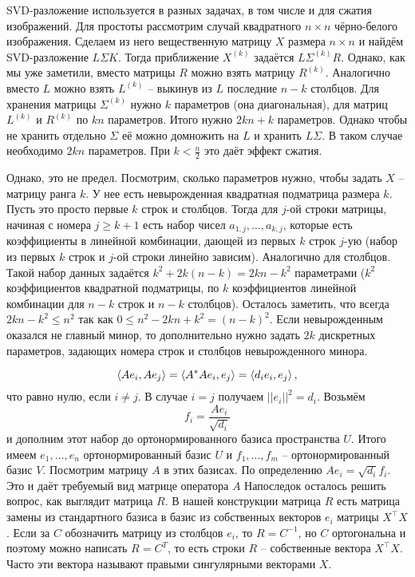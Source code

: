 SVD-разложение используется в разных задачах, в том числе и для сжатия изображений.  Для простоты рассмотрим случай квадратного $n \times n$ чёрно-белого изображения. Сделаем из него вещественную матрицу $X$ размера $n \times n$ и найдём SVD-разложение $L \Sigma K$. Тогда приближение $X^{(k)}$ задаётся $L\Sigma^{(k)}R$. Однако, как мы уже заметили, вместо матрицы $R$ можно взять матрицу $R^{(k)}$. Аналогично вместо $L$ можно взять $L^{(k)}$ -- выкинув из $L$ последние $n-k$ столбцов. Для хранения матрицы $\Sigma^{(k)}$ нужно $k$ параметров (она диагональная), для матриц $L^{(k)}$ и $R^{(k)}$ по $kn$ параметров. Итого нужно $2kn+k$ параметров. Однако чтобы не хранить отдельно $\Sigma$ её можно домножить на $L$ и хранить $L\Sigma$. В таком случае необходимо $2kn$ параметров. При $k<\frac{n}{2}$ это даёт эффект сжатия. 

Однако, это не предел. Посмотрим, сколько параметров нужно, чтобы задать $X$ -- матрицу ранга $k$. У нее есть невырожденная квадратная подматрица размера $k$. Пусть это просто первые $k$ строк и столбцов. Тогда для $j$-ой строки матрицы, начиная с номера $j \geq k+1$ есть набор чисел $a_{1,j},\dots,a_{k,j}$, которые есть коэффициенты в линейной комбинации, дающей из первых $k$ строк $j$-ую (набор из первых $k$ строк и $j$-ой строки линейно зависим). Аналогично для столбцов. Такой набор данных задаётся $k^2+ 2k(n-k)=2kn-k^2$ параметрами ($k^2$ коэффициентов квадратной подматрицы, по $k$ коэффициентов линейной комбинации для $n - k$ строк и $n - k$ столбцов). Осталось заметить, что всегда $2kn - k^2\leq n^2$ так как $0\leq n^2-2kn+k^2=(n-k)^2$. Если невырожденным оказался не главный минор, то дополнительно нужно задать $2k$ дискретных параметров, задающих номера строк и столбцов невырожденного минора.

$$\left\langle Ae_i, Ae_j\right\rangle = \left\langle A^{*}Ae_i,e_j \right\rangle = \left\langle d_i e_i,e_j\right\rangle,$$
что равно нулю, если $i\neq j$. В случае $i=j$ получаем $||e_i||^2=d_i$. Возьмём 
$$f_i=\frac{Ae_i}{\sqrt{d_i}}$$
и дополним этот набор до ортонормированного базиса пространства $U$. Итого имеем $e_1,\dots,e_n$ ортонормированный базис $U$ и $f_1,\dots,f_m$ -- ортонормированный базис $V$.
Посмотрим матрицу $A$ в этих базисах. По определению $Ae_i=\sqrt{d_i}f_i$. Это и даёт требуемый вид матрице оператора $A$
Напоследок осталось решить вопрос, как выглядит матрица $R$. В нашей конструкции матрица $R$ есть матрица замены из стандартного базиса в базис из собственных векторов $e_i$ матрицы $X^{\top}X$. Если за $C$ обозначить матрицу из столбцов $e_i$, то $R=C^{-1}$, но $C$ ортогональна и поэтому можно написать $R=C^{T}$, то есть строки $R$ -- собственные вектора $X^{\top}X$. Часто эти вектора называют правыми сингулярными векторами $X$.

